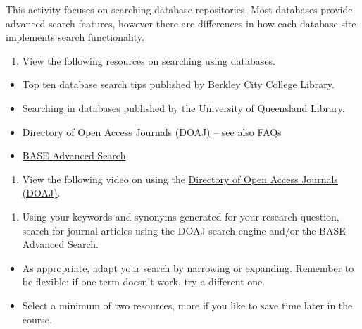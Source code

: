 \documentclass[
]{book}
\providecommand{\tightlist}{%
  \setlength{\itemsep}{0pt}\setlength{\parskip}{0pt}}
\theoremstyle{definition}
\theoremstyle{definition}
\theoremstyle{definition}
\theoremstyle{definition}
\theoremstyle{remark}
\begin{document}
\begin{reflect}
This activity focuses on searching database repositories. Most databases provide advanced search features, however there are differences in how each database site implements search functionality.

\begin{enumerate}
\def\labelenumi{\arabic{enumi}.}
\tightlist
\item
  View the following resources on searching using databases.
\end{enumerate}

\begin{itemize}
\tightlist
\item
  \href{https://www.berkeleycitycollege.edu/library/2011/04/04/databasesearchtips/}{Top ten database search tips} published by Berkley City College Library.\\
\item
  \href{https://web.library.uq.edu.au/research-tools-techniques/search-techniques/where-and-how-search/searching-databases}{Searching in databases} published by the University of Queensland Library.\\
\item
  \href{https://doaj.org/}{Directory of Open Access Journals (DOAJ)} -- see also FAQs\\
\item
  \href{https://mobile.base-search.net/Search/Advanced/}{BASE Advanced Search}
\end{itemize}

\begin{enumerate}
\def\labelenumi{\arabic{enumi}.}
\setcounter{enumi}{1}
\tightlist
\item
  View the following video on using the \href{https://www.youtube.com/watch?v=ndvLm9MIfKA}{Directory of Open Access Journals (DOAJ)}.
\end{enumerate}

\begin{enumerate}
\def\labelenumi{\arabic{enumi}.}
\setcounter{enumi}{2}
\tightlist
\item
  Using your keywords and synonyms generated for your research question, search for journal articles using the DOAJ search engine and/or the BASE Advanced Search.
\end{enumerate}

\begin{itemize}
\tightlist
\item
  As appropriate, adapt your search by narrowing or expanding. Remember to be flexible; if one term doesn't work, try a different one.\\
\item
  Select a minimum of two resources, more if you like to save time later in the course.\\
\end{itemize}


\end{reflect}
\end{document}
